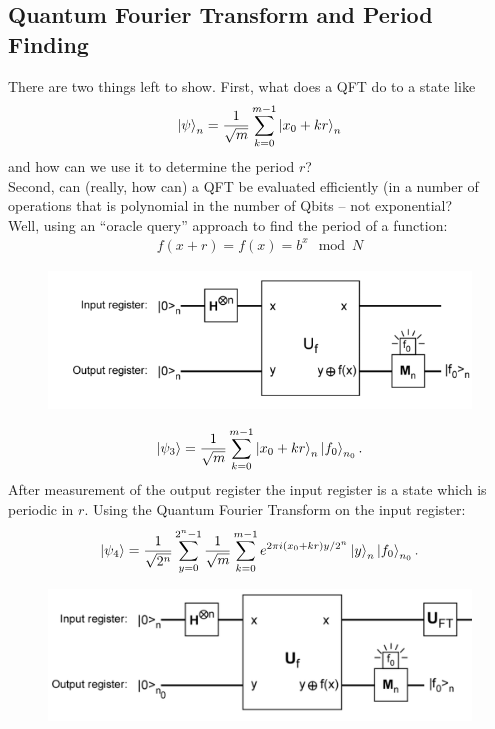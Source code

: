 \documentclass{book}
\theoremstyle{definition}
\newcommand{\f}[2]{\frac{#1}{#2}}
\begin{document}
\subsection{Quantum Fourier Transform and Period Finding}

There are two things left to show. First, what does a QFT do to a state like
\begin{align}
\ket{\psi}_n = \f{1}{\sqrt{m}}\sum^{m-1}_{k=0}\ket{x_0 + kr}_n
\end{align}
and how can we use it to determine the period $r$?\\

Second, can (really, how can) a QFT be evaluated efficiently (in a number of operations that is polynomial in the number of Qbits – not exponential? \\


Well, using an “oracle query” approach to find the period of a function:
\begin{align}
f(x + r) = f(x) = b^x \mod N
\end{align} 


\begin{figure}[!htb]
	\centering
	\includegraphics[scale=0.5]{shor6}
\end{figure}

\begin{align}
\ket{\psi_3} = \f{1}{\sqrt{m}}\sum^{m-1}_{k=0}\ket{x_0 + kr}_n \ket{f_0}_{n_0}.
\end{align}
After measurement of the output register the input register is a
state which is periodic in $r$. Using the Quantum Fourier Transform on the input register:
\begin{align}
\ket{\psi_4} = \f{1}{\sqrt{2^n}}\sum^{2^n-1}_{y=0}\f{1}{\sqrt{m}}\sum^{m-1}_{k=0}e^{2\pi i (x_0 + kr)y/2^n}\ket{y}_n\ket{f_0}_{n_0}.
\end{align} 
\begin{figure}[!htb]
	\centering
	\includegraphics[scale=0.5]{shor7}
\end{figure}
\end{document}
